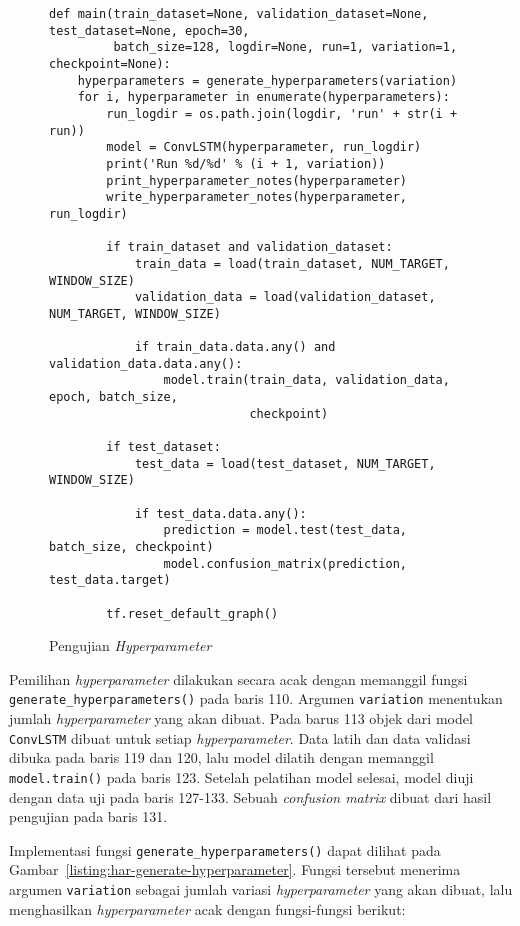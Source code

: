 \begin{figure}[h]
\begin{verbatim}
def main(train_dataset=None, validation_dataset=None, test_dataset=None, epoch=30,
         batch_size=128, logdir=None, run=1, variation=1, checkpoint=None):
    hyperparameters = generate_hyperparameters(variation)
    for i, hyperparameter in enumerate(hyperparameters):
        run_logdir = os.path.join(logdir, 'run' + str(i + run))
        model = ConvLSTM(hyperparameter, run_logdir)
        print('Run %d/%d' % (i + 1, variation))
        print_hyperparameter_notes(hyperparameter)
        write_hyperparameter_notes(hyperparameter, run_logdir)

        if train_dataset and validation_dataset:
            train_data = load(train_dataset, NUM_TARGET, WINDOW_SIZE)
            validation_data = load(validation_dataset, NUM_TARGET, WINDOW_SIZE)

            if train_data.data.any() and validation_data.data.any():
                model.train(train_data, validation_data, epoch, batch_size,
                            checkpoint)

        if test_dataset:
            test_data = load(test_dataset, NUM_TARGET, WINDOW_SIZE)

            if test_data.data.any():
                prediction = model.test(test_data, batch_size, checkpoint)
                model.confusion_matrix(prediction, test_data.target)

        tf.reset_default_graph()
\end{verbatim}
\caption{Pengujian \textit{Hyperparameter}}
\label{listing:har-pengujian-hyperparameter}
\end{figure}

Pemilihan \textit{hyperparameter} dilakukan secara acak dengan memanggil fungsi \texttt{generate_hyperparameters()} pada baris 110. Argumen \texttt{variation} menentukan jumlah \textit{hyperparameter} yang akan dibuat. Pada barus 113 objek dari model \texttt{ConvLSTM} dibuat untuk setiap \textit{hyperparameter}. Data latih dan data validasi dibuka pada baris 119 dan 120, lalu model dilatih dengan memanggil \texttt{model.train()} pada baris 123. Setelah pelatihan model selesai, model diuji dengan data uji pada baris 127-133. Sebuah \textit{confusion matrix} dibuat dari hasil pengujian pada baris 131.

Implementasi fungsi \texttt{generate_hyperparameters()} dapat dilihat pada Gambar~\ref{listing:har-generate-hyperparameter}. Fungsi tersebut menerima argumen \texttt{variation} sebagai jumlah variasi \textit{hyperparameter} yang akan dibuat, lalu menghasilkan \textit{hyperparameter} acak dengan fungsi-fungsi berikut:

